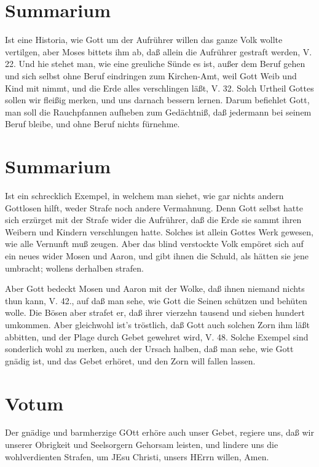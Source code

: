 \section{Summarium}

Ist eine Historia, wie Gott um der Aufrührer willen das ganze Volk wollte vertilgen, aber Moses bittets ihm ab, daß allein die Aufrührer gestraft werden, V. 22. Und hie stehet man, wie eine greuliche Sünde es ist, außer dem Beruf gehen und sich selbst ohne Beruf eindringen zum Kirchen-Amt, weil Gott Weib und Kind mit nimmt, und die Erde alles verschlingen läßt, V. 32. Solch Urtheil Gottes sollen wir fleißig merken, und uns darnach bessern lernen. Darum befiehlet Gott, man soll die Rauchpfannen aufheben zum Gedächtniß, daß jedermann bei seinem Beruf bleibe, und ohne Beruf nichts fürnehme.

\section{Summarium}

Ist ein schrecklich Exempel, in welchem man siehet, wie gar nichts andern Gottlosen hilft, weder Strafe noch andere Vermahnung. Denn Gott selbst hatte sich erzürget mit der Strafe wider die Aufrührer, daß die Erde sie sammt ihren Weibern und Kindern verschlungen hatte. Solches ist allein Gottes Werk gewesen, wie alle Vernunft muß zeugen. Aber das blind verstockte
Volk empöret sich auf ein neues wider Mosen und Aaron, und gibt ihnen die Schuld, als hätten sie jene umbracht; wollens derhalben strafen.

Aber Gott bedeckt Mosen und Aaron mit der Wolke, daß ihnen niemand nichts thun kann, V. 42., auf daß man sehe, wie Gott die Seinen schützen und behüten wolle. Die Bösen aber strafet er, daß ihrer vierzehn tausend und sieben hundert umkommen. Aber gleichwohl ist’s tröstlich, daß Gott auch solchen Zorn ihm läßt abbitten, und der Plage durch Gebet gewehret wird, V. 48. Solche Exempel sind sonderlich wohl zu merken, auch der Ursach halben, daß man sehe, wie Gott gnädig ist, und das Gebet erhöret, und den Zorn will fallen lassen.

\section{Votum}

Der gnädige und barmherzige GOtt erhöre auch unser Gebet, regiere uns, daß wir unserer Obrigkeit und Seelsorgern Gehorsam leisten, und lindere uns die wohlverdienten Strafen, um JEsu Christi, unsers HErrn willen, Amen.

